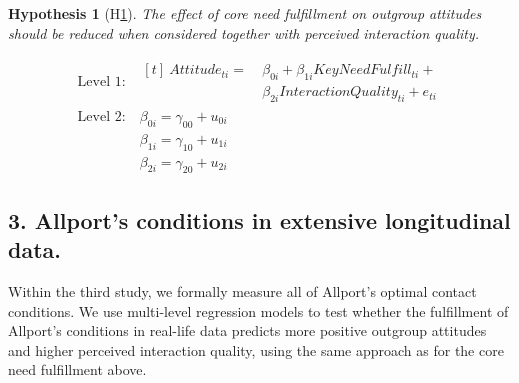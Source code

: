 \documentclass[man, 12pt, a4paper, mask]{apa7}
\theoremstyle{break}
\theoremstyle{plain}
\newtheorem{subhyp}{Hypothesis}
\begin{document}
\begin{mdframed}[style=mdfhypothesis]
    \begin{subhyp}[H\ref{hyp:keyNeedMediation}] \label{hyp:keyNeedMediation}
    \addtolength{\leftskip}{\subhypskip}
    The effect of core need fulfillment on outgroup attitudes should be reduced when considered together with perceived interaction quality.
    \end{subhyp}
    
    \begin{fleqn}[\eqskip]
      \begin{equation} \label{eq:SlopesAttCoreQual}
        \begin{split}
          \textrm{Level 1:} &
            \begin{aligned}[t]
              \ Attitude_{ti} =  &\ \beta_{0i} + \beta_{1i}KeyNeedFulfill_{ti} + \\
                                 &\ \beta_{2i}InteractionQuality_{ti} + e_{ti}
            \end{aligned} \\
          \textrm{Level 2:} &\ \beta_{0i} = \gamma_{00} + u_{0i} \\
                            &\ \beta_{1i} = \gamma_{10} + u_{1i} \\
                            &\ \beta_{2i} = \gamma_{20} + u_{2i}
        \end{split} 
      \end{equation}
    \end{fleqn}
\end{mdframed}

\subsection{3. Allport's conditions in extensive longitudinal data.}
Within the third study, we formally measure all of Allport's optimal contact conditions. We use multi-level regression models to test whether the fulfillment of Allport's conditions in real-life data predicts more positive outgroup attitudes and higher perceived interaction quality, using the same approach as for the core need fulfillment above.
\end{document}
